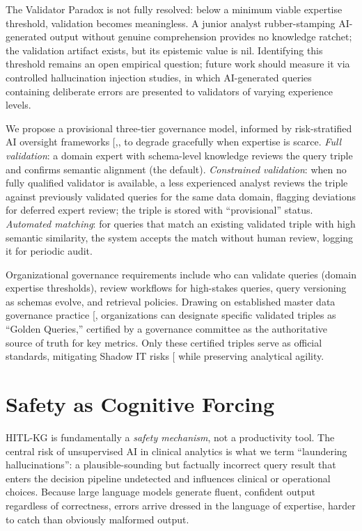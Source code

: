 \documentclass[
  american,
  11pt,
  letterpaper,
  oneside  ,captions=tableheading
]{scrartcl}
\begin{document}
The Validator Paradox is not fully resolved: below a minimum viable
expertise threshold, validation becomes meaningless. A junior analyst
rubber-stamping AI-generated output without genuine comprehension
provides no knowledge ratchet; the validation artifact exists, but its
epistemic value is nil. Identifying this threshold remains an open
empirical question; future work should measure it via controlled
hallucination injection studies, in which AI-generated queries
containing deliberate errors are presented to validators of varying
experience levels.

We propose a provisional three-tier governance model, informed by
risk-stratified AI oversight frameworks
{[},\citeproc{ref-labkoff2024}{74}{]},
to degrade gracefully when expertise is scarce. \emph{Full validation}:
a domain expert with schema-level knowledge reviews the query triple and
confirms semantic alignment (the default). \emph{Constrained
validation}: when no fully qualified validator is available, a less
experienced analyst reviews the triple against previously validated
queries for the same data domain, flagging deviations for deferred
expert review; the triple is stored with ``provisional'' status.
\emph{Automated matching}: for queries that match an existing validated
triple with high semantic similarity, the system accepts the match
without human review, logging it for periodic audit.

Organizational governance requirements include who can validate queries
(domain expertise thresholds), review workflows for high-stakes queries,
query versioning as schemas evolve, and retrieval policies. Drawing on
established master data governance practice
{[}\citeproc{ref-loshin2010}{75}{]}, organizations can designate
specific validated triples as ``Golden Queries,'' certified by a
governance committee as the authoritative source of truth for key
metrics. Only these certified triples serve as official standards,
mitigating Shadow IT risks {[}\citeproc{ref-zimmermann2017}{76}{]} while
preserving analytical agility.

\section{Safety as Cognitive Forcing}\label{safety-as-cognitive-forcing}

HITL-KG is fundamentally a \emph{safety mechanism}, not a productivity
tool. The central risk of unsupervised AI in clinical analytics is what
we term ``laundering hallucinations'': a plausible-sounding but
factually incorrect query result that enters the decision pipeline
undetected and influences clinical or operational choices. Because large
language models generate fluent, confident output regardless of
correctness, errors arrive dressed in the language of expertise, harder
to catch than obviously malformed output.
\end{document}
